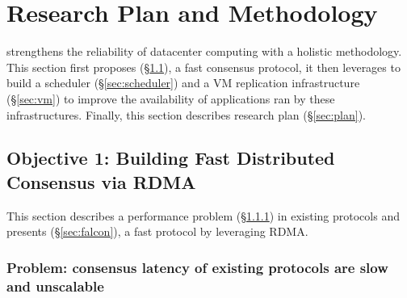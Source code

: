 \vspace{-.15in}\section{Research Plan and Methodology}
\label{sec:rep}\vspace{-.075in}

\xxx strengthens the reliability of datacenter computing with a holistic 
methodology. This section first proposes \falcon (\S\ref{sec:protocol}), a fast 
consensus protocol, it then leverages \falcon to build a scheduler 
(\S\ref{sec:scheduler}) and a VM replication infrastructure (\S\ref{sec:vm}) to 
improve the availability of applications ran by these infrastructures. 
Finally, this section describes research plan (\S\ref{sec:plan}).

\vspace{-.15in}\subsection{Objective 1: Building Fast Distributed Consensus via
RDMA}\label{sec:protocol}\vspace{-.075in}

This section describes a performance problem (\S\ref{sec:latency-problem}) in 
existing \paxos protocols and presents \falcon (\S\ref{sec:falcon}), a 
fast \paxos protocol by leveraging RDMA.

\vspace{-.15in}
\subsubsection{Problem: consensus latency of existing \paxos 
protocols are slow and unscalable} 
\label{sec:latency-problem}\vspace{-.075in}



